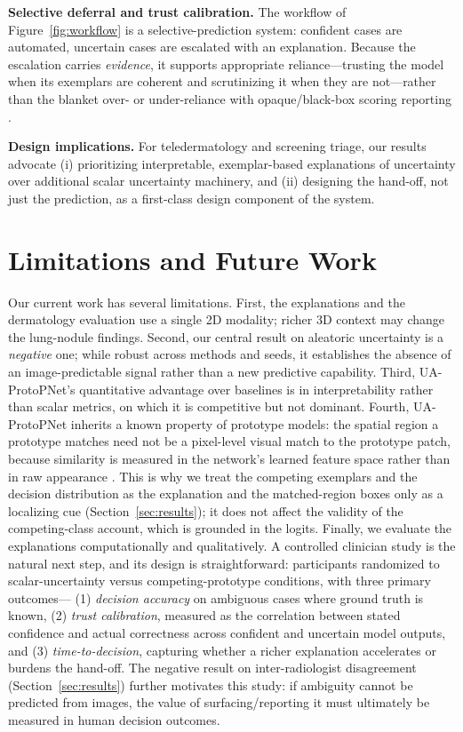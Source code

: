 \documentclass[10pt]{article}
\newcommand{\method}{UA-ProtoPNet}
\begin{document}
\textbf{Selective deferral and trust calibration.} The workflow of
Figure~\ref{fig:workflow} is a selective-prediction system: confident cases are
automated, uncertain cases are escalated with an explanation. Because the
escalation carries \emph{evidence}, it supports appropriate reliance---trusting
the model when its exemplars are coherent and scrutinizing it when they are
not---rather than the blanket over- or under-reliance with opaque/black-box scoring reporting .

\textbf{Design implications.} For teledermatology and screening triage, our
results advocate (i) prioritizing interpretable, exemplar-based explanations of
uncertainty over additional scalar uncertainty machinery, and (ii) designing the
hand-off, not just the prediction, as a first-class design component of the system.


\section{Limitations and Future Work}

Our current work has several limitations. First, the explanations and
the dermatology evaluation use a single 2D modality; richer 3D context may
change the lung-nodule findings. Second, our central result on aleatoric
uncertainty is a \emph{negative} one; while robust across methods and seeds, it
establishes the absence of an image-predictable signal rather than a new
predictive capability. Third, \method{}'s quantitative advantage over baselines
is in interpretability rather than scalar metrics, on which it is competitive
but not dominant. Fourth, \method{} inherits a known property of prototype
models: the spatial region a prototype matches need not be a pixel-level visual
match to the prototype patch, because similarity is measured in the network's
learned feature space rather than in raw appearance
\parencite{hoffmann2021looks}. This is why we treat the competing exemplars and
the decision distribution as the explanation and the matched-region boxes only as
a localizing cue (Section~\ref{sec:results}); it does not affect the validity of
the competing-class account, which is grounded in the logits. Finally, we evaluate the explanations computationally and qualitatively.
A controlled clinician study is the natural next step, and its design is
straightforward: participants randomized to scalar-uncertainty versus
competing-prototype conditions, with three primary outcomes---
(1) \emph{decision accuracy} on ambiguous cases where ground truth is known,
(2) \emph{trust calibration}, measured as the correlation between stated
confidence and actual correctness across confident and uncertain model outputs,
and (3) \emph{time-to-decision}, capturing whether a richer explanation
accelerates or burdens the hand-off. The negative result on inter-radiologist
disagreement (Section~\ref{sec:results}) further motivates this study: if
ambiguity cannot be predicted from images, the value of surfacing/reporting it must
ultimately be measured in human decision outcomes.
\end{document}

